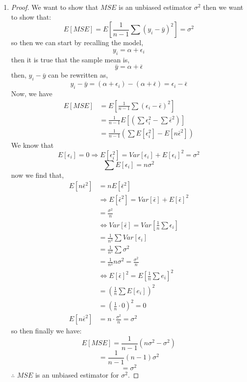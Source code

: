 \documentclass[12pt]{article}
\begin{document}
\begin{enumerate}[1.]
        \item 
        \begin{proof} We want to show that $MSE$ is an unbiased estimator $\sigma^2$ then we want to show that:
            \[E[MSE] = E\left[\frac{1}{n-1} \sum (y_i - \bar{y})^2 \right] = \sigma^2 \]
            so then we can start by recalling the model,
            \[ y_i = \alpha + \epsilon_i \]
            then it is true that the sample mean is,
            \[ \bar{y} = \alpha + \bar{\epsilon}\]
            then, $y_i - \bar{y}$ can be rewritten as,
            \[ y_i - \bar{y} = (\alpha + \epsilon_i) - (\alpha + \bar{\epsilon}) = \epsilon_i - \bar{\epsilon}\]
            Now, we have
            \begin{align*}
                E[MSE] &= E\left[\frac{1}{n-1} \sum (\epsilon_i - \bar{\epsilon})^2 \right] \\ 
                &= \frac{1}{n-1} E\left[(\sum \epsilon_i^2 - \sum \bar{\epsilon}^2) \right] \\ 
                &= \frac{1}{n-1} (\sum E[\epsilon_i^2] - E[n\bar{\epsilon}^2] )
            \end{align*}
            We know that 
            \[E[\epsilon_i] = 0 \Rightarrow E[\epsilon_i^2] = Var[\epsilon_i] + E[\epsilon_i]^2 = \sigma^2\]
            \[\sum E[\epsilon_i] = n\sigma^2\]
            now we find that,
            \begin{align*}
                E[n\bar{\epsilon}^2] &= nE[\bar{\epsilon}^2] \\
                &\Rightarrow E[\bar{\epsilon}^2] = Var[\bar{\epsilon}] + E[\bar{\epsilon}]^2 \\
                &= \frac{\sigma^2}{n}\\
                &\Leftrightarrow Var[\bar{\epsilon}] = Var[\frac{1}{n} \sum \epsilon_i] \\
                &= \frac{1}{n^2} \sum Var[\epsilon_i] \\
                &= \frac{1}{n^2} \sum \sigma^2 \\
                &= \frac{1}{n^2} n \sigma^2 = \frac{\sigma^2}{n}  \\
                &\Leftrightarrow E[\bar{\epsilon}]^2 = E[\frac{1}{n} \sum e_i]^2 \\ 
                &= (\frac{1}{n} \sum E[e_i])^2 \\ 
                &= (\frac{1}{n} \cdot 0)^2  = 0 \\ 
                E[n\bar{\epsilon}^2] &= n \cdot \frac{\sigma^2}{n} = \sigma^2
            \end{align*}
            so then finally we have:
            \[E[MSE] = \frac{1}{n-1}(n\sigma^2 - \sigma^2) \]
            \[= \frac{1}{n-1} (n-1) \sigma^2 \]
            \[=  \sigma^2\]
            $\therefore$ $MSE$ is an unbiased estimator for $\sigma^2$.
        \end{proof}


\end{enumerate}
\end{document}
